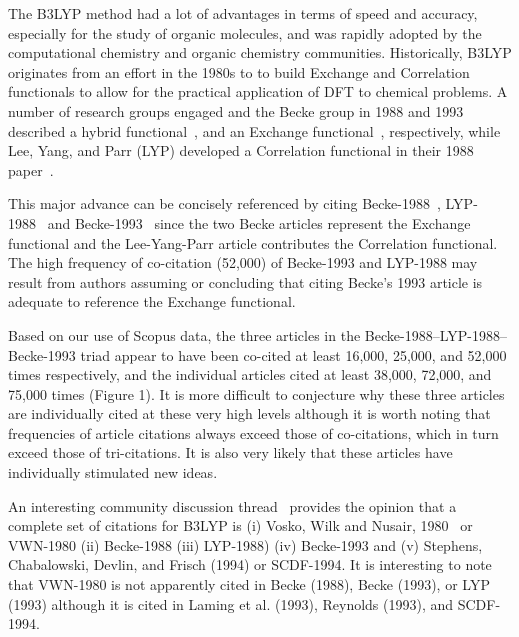 \documentclass[journal=jcdis8,manuscript=article]{achemso}
\begin{document}
The B3LYP method had a lot of advantages in terms of speed and accuracy, especially for the study of organic molecules, and was rapidly adopted by the computational chemistry and organic chemistry communities. Historically, B3LYP originates from an effort in the 1980s to to build Exchange and Correlation functionals to allow for the practical application of DFT to chemical problems. A number of research groups engaged and the Becke group in 1988 and 1993 described a hybrid functional~\citep{becke1988density}, and an Exchange functional~\citep{becke1993dft}, respectively, while Lee, Yang, and Parr (LYP) developed a Correlation functional in their 1988 paper~\citep{lyp1988}.  

This major advance can be concisely referenced by citing Becke-1988~\citep{becke1988density}, LYP-1988~\citep{lyp1988} and Becke-1993~\citep{becke1993dft} since the two Becke articles represent the Exchange functional and the Lee-Yang-Parr article contributes the Correlation functional. The high frequency of co-citation (52,000) of Becke-1993 and LYP-1988 may result from authors assuming or concluding that citing Becke's 1993 article is adequate to reference the Exchange functional. 

Based on our use of Scopus data, the three articles in the Becke-1988--LYP-1988--Becke-1993 triad appear to have been co-cited at least 16,000, 25,000, and 52,000 times respectively, and the individual articles cited at least 38,000, 72,000, and 75,000 times (Figure 1). It is more difficult to conjecture why these three articles are individually cited at these very high levels although it is worth noting that  frequencies of article citations always exceed those of co-citations, which in turn exceed those of tri-citations. It is also very likely that these articles have individually stimulated new ideas.

An interesting community discussion thread~\citep{johansson2002} provides the opinion that a complete set of citations for B3LYP is (i) Vosko, Wilk and Nusair, 1980~\citep{vosko1980accurate} or VWN-1980 (ii) Becke-1988 (iii) LYP-1988) (iv) Becke-1993 and (v) Stephens, Chabalowski, Devlin, and Frisch (1994) or SCDF-1994. It is interesting to note that VWN-1980  is not apparently cited in Becke (1988), Becke (1993), or LYP (1993) although it is cited in Laming et al. (1993), Reynolds (1993), and SCDF-1994.
\end{document}
